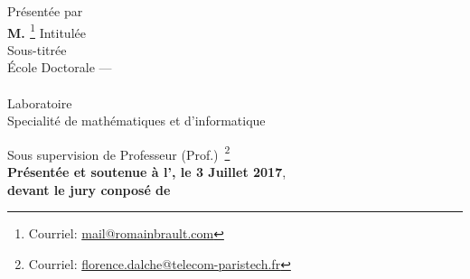 \begin{titlepage}
\begin{addmargin}[-1cm]{-3cm}
\begin{center}
{                \color{PSaclay}\textsc{\myUniTP}}
            \endgroup
            \bigskip\vfill
            \begingroup
                Pr\'esent\'ee par \\
                {\Large\textbf{M. \textsc{\myName}}}\footnote{Courriel:
                \href{mailto:mail@romainbrault.com}{mail@romainbrault.com}}
            \endgroup
            \bigskip\vfill
            \begingroup
                Intitul\'ee \\ \smallskip {\Huge
                \color{PSaclay}\textsc{\mySubtitle}}
            \endgroup
            \bigskip
            \vfill
            \begingroup
                Sous-titr\'ee \\ {\Large \textbf{\textsc{\myTitle}}}
            \endgroup
            \bigskip
            \vfill
            \begingroup
                \'Ecole Doctorale --- \EDN\\
                \myDoctoralSchool\\
                Laboratoire \myFaculty\\
                Specialit\'e de math\'ematiques et d'informatique
                \medskip
            \endgroup
        \end{center}
        \vspace{1cm}
        \vfill
        \noindent Sous supervision de
        Professeur (Prof.)~\textsc{\mySupervisor}\footnote{Courriel:
        \href{mailto:florence.dalche@telecom-paristech.fr}%
        {florence.dalche@telecom-paristech.fr}}\\
        \smallskip
        \noindent \textbf{Pr\'esent\'ee et soutenue \`a l'\myUniUEVE, le 3
        Juillet 2017}, \\
        \smallskip
        \noindent \textbf{devant le jury conpos\'e de}

\end{addmargin}
\end{titlepage}
